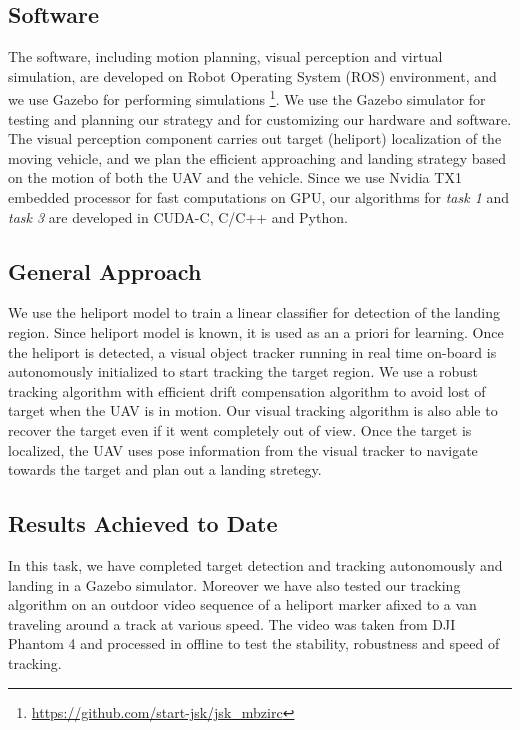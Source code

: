 \documentclass{standalone}
\begin{document}
\subsection{Software}

The software, including motion planning, visual perception and virtual simulation, are developed on Robot Operating System (ROS) environment, and we use Gazebo for performing simulations \footnote{\url{https://github.com/start-jsk/jsk_mbzirc}}. We use the Gazebo simulator for testing and planning our strategy and for customizing our hardware and software. The visual perception component carries out target (heliport) localization of the moving vehicle, and we plan the efficient approaching and landing strategy based on the motion of both the UAV and the vehicle. Since we use Nvidia TX1 embedded processor for fast computations on GPU, our algorithms for \textit{task 1} and \textit{task 3} are developed in CUDA-C, C/C++ and Python. 



\subsection{General Approach}

We use the heliport model to train a linear classifier for detection of the landing region. Since heliport model is known, it is used as an a priori for learning. Once the heliport is detected, a visual object tracker running in real time on-board is autonomously initialized to start tracking the target region. We use a robust tracking algorithm with efficient drift compensation algorithm to avoid lost of target when the UAV is in motion. Our visual tracking algorithm is also able to recover the target even if it went completely out of view. Once the target is localized, the UAV uses pose information from the visual tracker to navigate towards the target and plan out a landing stretegy.

\subsection{Results Achieved to Date}
In this task, we have completed target detection and tracking autonomously and landing in a Gazebo simulator. 
Moreover we have also tested our tracking algorithm on an outdoor video sequence of a heliport marker afixed to a van traveling around a track at various speed. The video was taken from DJI Phantom 4 and processed in offline to test the stability, robustness and speed of tracking.
\end{document}
